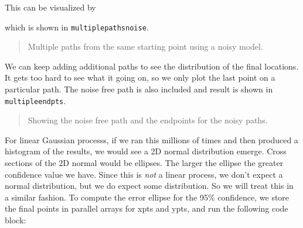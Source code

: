 This can be visualized by

\hypertarget{lst:plotpoints}{%
\label{lst:plotpoints}}%
\begin{Shaded}
\begin{Highlighting}[]
\OperatorTok{,}\OperatorTok{,}\OperatorTok{=}\NormalTok{)}
\OperatorTok{=}\OperatorTok{:}
\OperatorTok{!}\NormalTok{(xpath[j}\OperatorTok{,:}\NormalTok{]}\OperatorTok{,}\NormalTok{ ypath[j}\OperatorTok{,:}\NormalTok{]}\OperatorTok{,}\OperatorTok{=}\NormalTok{)}

\OperatorTok{=}\OperatorTok{!}\OperatorTok{=}\NormalTok{)}
\end{Highlighting}
\end{Shaded}

which is shown in \texttt{multiplepathsnoise}.

\begin{quote}
Multiple paths from the same starting point using a noisy model.
\end{quote}

We can keep adding additional paths to see the distribution of the final
locations. It gets too hard to see what it going on, so we only plot the
last point on a particular path. The noise free path is also included
and result is shown in \texttt{multipleendpts}.

\begin{quote}
Showing the noise free path and the endpoints for the noisy paths.
\end{quote}

For linear Gaussian processs, if we ran this millions of times and then
produced a histogram of the results, we would see a 2D normal
distribution emerge. Cross sections of the 2D normal would be ellipses.
The larger the ellipse the greater confidence value we have. Since this
is \emph{not} a linear process, we don't expect a normal distribution,
but we do expect some distribution. So we will treat this in a similar
fashion. To compute the error ellipse for the 95\% confidence, we store
the final points in parallel arrays for xpts and ypts, and run the
following code block:

